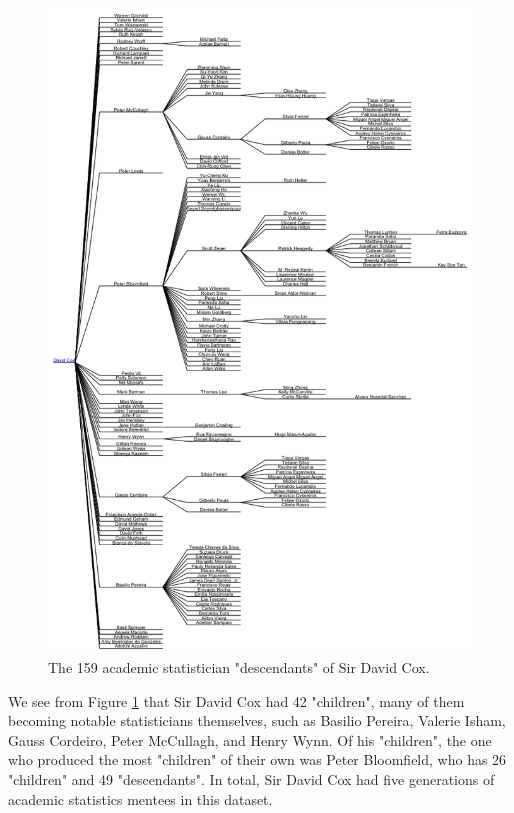 \documentclass[11pt,a4paper,oldfontcommands,openany]{memoir}
\numberwithin{equation}{section} %
\begin{document}
\begin{figure}%
    \centering
    \includegraphics[width=\textwidth]{dCox.png}
    \caption{The 159 academic statistician "descendants" of Sir David Cox.}
    \label{fig:dCox}
\end{figure}

We see from Figure \ref{fig:dCox} that Sir David Cox had 42 "children", many of them becoming notable statisticians themselves, such as Basilio Pereira, Valerie Isham, Gauss Cordeiro, Peter McCullagh, and Henry Wynn. Of his "children", the one who produced the most "children" of their own was Peter Bloomfield, who has 26 "children" and 49 "descendants". In total, Sir David Cox had five generations of academic statistics mentees in this dataset.
\end{document}
